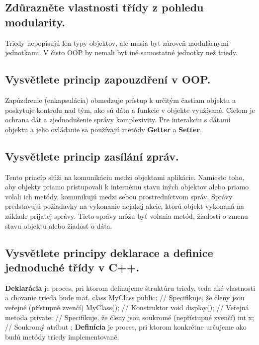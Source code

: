\subsection{Zdůrazněte vlastnosti třídy z pohledu modularity.}
Triedy nepopisujú len typy objektov, ale musia byť zároveň modulárnymi jednotkami. V čisto OOP by nemali byť iné samostatné jednotky než triedy.


\subsection{Vysvětlete princip zapouzdření v OOP.}
Zapúzdrenie (enkapsulácia) obmedzuje prístup k určitým častiam objektu a poskytuje kontrolu nad tým, ako sú dáta a funkcie v objekte využívané. \newline
Cieľom je ochrana dát a zjednodušenie správy komplexivity. Pre interakciu s dátami objektu a jeho ovládanie sa používajú metódy \textbf{Getter} a \textbf{Setter}.


\subsection{Vysvětlete princip zasílání zpráv.}
Tento princíp slúži na komunikáciu medzi objektami aplikácie. Namiesto toho, aby objekty priamo pristupovali k internému stavu iných objektov alebo priamo volali ich metódy, komunikujú medzi sebou prostredníctvom správ. \newline
Správy predstavujú požiadavky na vykonanie nejakej akcie, ktorú objekt vykonaná na základe prijatej správy. Tieto správy môžu byť volania metód, žiadosti o zmenu stavu objektu alebo žiadosť o dáta.


\subsection{Vysvětlete principy deklarace a definice jednoduché třídy v C++.}
\textbf{Deklarácia} je proces, pri ktorom definujeme štruktúru triedy, teda aké vlastnosti a chovanie trieda bude mať.
class MyClass {
public: // Specifikuje, že členy jsou veřejné (přístupné zvenčí)
    MyClass(); // Konstruktor
    void display(); // Veřejná metoda
private: // Specifikuje, že členy jsou soukromé (nepřístupné zvenčí)
    int x; // Soukromý atribut
};
\newline
\textbf{Definícia} je proces, pri ktorom konkrétne určujeme ako budú metódy triedy implementované.
